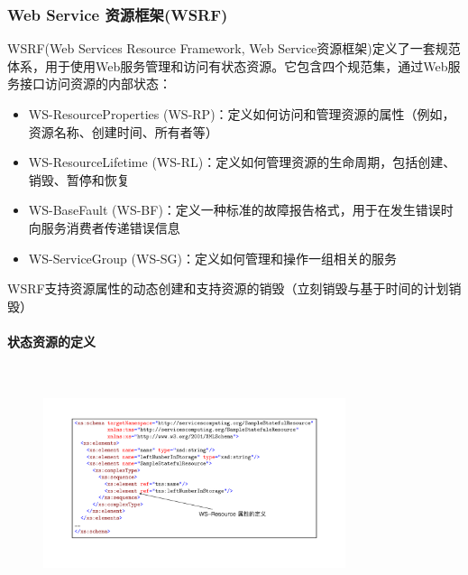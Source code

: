 \subsubsection{Web Service 资源框架(WSRF)}
WSRF(Web Services Resource Framework, Web Service资源框架)定义了一套规范体系，用于使用Web服务管理和访问有状态资源。它包含四个规范集，通过Web服务接口访问资源的内部状态：
\begin{itemize}
    \item WS-ResourceProperties (WS-RP)：定义如何访问和管理资源的属性（例如，资源名称、创建时间、所有者等）
    \item WS-ResourceLifetime (WS-RL)：定义如何管理资源的生命周期，包括创建、销毁、暂停和恢复
    \item WS-BaseFault (WS-BF)：定义一种标准的故障报告格式，用于在发生错误时向服务消费者传递错误信息
    \item WS-ServiceGroup (WS-SG)：定义如何管理和操作一组相关的服务
\end{itemize}

WSRF支持资源属性的动态创建和支持资源的销毁（立刻销毁与基于时间的计划销毁）

\paragraph*{状态资源的定义}~{} \par
\begin{figure}[H]
    \vspace{-0.5em}
	\centering
	\includegraphics[width=0.79\textwidth]{images/状态资源的定义.pdf}
    \vspace{-1em}
\end{figure}

